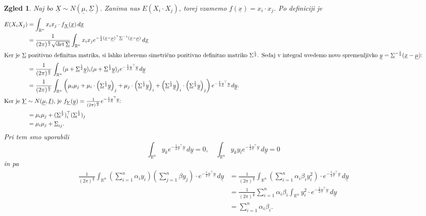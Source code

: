 \documentclass[10pt, a4paper]{article}
\newtheorem{zgled}[izr]{Zgled}
\newcommand{\R}{\mathbb {R}}
\begin{document}
\begin{zgled}
  Naj bo $\underline{X} \sim N(\underline{\mu}, \underline{\Sigma})$.
  Zanima nas $E(X_i \cdot X_j)$, torej vzamemo $f(\underline{x}) = x_i \cdot x_j$.
  Po definiciji je 
  \begin{align*}
    E(X_i X_j) &= \int_{\R^n} x_i x_j \cdot f_{\underline{X}} (\underline{x})\, d\underline{x}\\
    &= \frac{1}{(2 \pi)^{\frac{n}{2}} \sqrt{\det \underline{\Sigma}}} \int_{\R^n} x_i x_j e^{-\frac{1}{2} (\underline{x} - \underline{\mu})^\top \underline{\Sigma}^{-1} (\underline{x} - \underline{\mu})}\, d\underline{x}\\
    \intertext{Ker je $\underline{\Sigma}$ pozitivno definitna matrika, si lahko izberemo simetrično pozitivno definitno matriko $\Sigma^{\frac{1}{2}}$.
    Sedaj v integral uvedemo novo spremenljivko $\underline{y} = \underline{\Sigma}^{-\frac{1}{2}} (\underline{x} - \underline{\mu})$:}
    &= \frac{1}{(2 \pi)^{\frac{n}{2}}} \int_{\R^n} (\mu + \underline{\Sigma}^{\frac{1}{2}} \underline{y})_i (\mu + \underline{\Sigma}^{\frac{1}{2}} \underline{y})_j e^{-\frac{1}{2} \underline{y}^\top \underline{y}}\, d\underline{y}\\
    &= \frac{1}{(2 \pi)^{\frac{n}{2}}} \int_{\R^n} \left(\mu_i \mu_j + \mu_i \cdot \left(\underline{\Sigma}^{\frac{1}{2}} \underline{y}\right)_j + \mu_j \cdot \left(\underline{\Sigma}^{\frac{1}{2}} \underline{y}\right)_i + \left(\underline{\Sigma}^{\frac{1}{2}} \underline{y}\right)_i \cdot \left(\underline{\Sigma}^{\frac{1}{2}} \underline{y}\right)_j\right) e^{-\frac{1}{2} \underline{y}^\top \underline{y}}\, d\underline{y}.\\
    \intertext{Ker je $\underline{Y} \sim N(\underline{\mu}, \underline{I})$, je $f_{\underline{Y}} (\underline{y}) = \frac{1}{(2 \pi)^{\frac{n}{2}}} e^{-\frac{1}{2} \underline{y}^\top \underline{y}}$:}
    &= \mu_i \mu_j + (\underline{\Sigma}^{\frac{1}{2}})_i^\top (\underline{\Sigma}^{\frac{1}{2}})_j\\
    &= \mu_i \mu_j + \underline{\Sigma}_{ij}.
  \end{align*}
  Pri tem smo uporabili 
  $$\int_{\R^n} y_k e^{-\frac{1}{2} \underline{y}^\top \underline{y}}\, d\underline{y} = 0,\quad \int_{\R^n} y_k y_l e^{-\frac{1}{2} \underline{y}^\top \underline{y}}\, d\underline{y} = 0$$
  in pa 
  \begin{align*}
    \frac{1}{(2 \pi)^{\frac{n}{2}}} \int_{\R^n} \left(\sum_{i = 1} ^n \alpha_i y_i \right) \left(\sum_{j = 1} ^n \beta y_j \right) \cdot e^{-\frac{1}{2} \underline{y}^\top \underline{y}}\, d\underline{y} &= \frac{1}{(2 \pi)^{\frac{n}{2}}} \int_{\R^n} \left(\sum_{i = 1} ^n \alpha_i \beta_i y_i ^2 \right) \cdot e^{-\frac{1}{2} \underline{y}^\top \underline{y}}\, d\underline{y}\\
    &= \frac{1}{(2 \pi)^{\frac{n}{2}}} \sum_{i = 1} ^n \alpha_i \beta_i \int_{\R^n} y_i ^2 \cdot e^{-\frac{1}{2} \underline{y}^\top \underline{y}}\, d\underline{y}\\
    &= \sum_{i = 1} ^n \alpha_i \beta_i.
  \end{align*}
\end{zgled}
\end{document}
